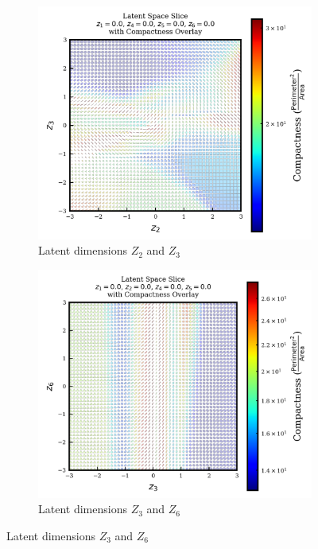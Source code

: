 \documentclass{article}
\begin{document}
\begin{figure}[H]
  \centering

  \begin{subfigure}{0.48\textwidth}
    \centering
    \includegraphics[width=\textwidth]{figures/VAEmodels/model5/varying_z2_z3_fixed_z1=0.0_z4=0.0_z5=0.0_z6=0.0.png}
    \caption{Latent dimensions $Z_2$ and $Z_3$}
    \label{fig:model5_z2_z3}
  \end{subfigure}
  \hfill
  \begin{subfigure}{0.48\textwidth}
    \centering
    \includegraphics[width=\textwidth]{figures/VAEmodels/model5/varying_z3_z6_fixed_z1=0.0_z2=0.0_z4=0.0_z5=0.0.png}
    \caption{Latent dimensions $Z_3$ and $Z_6$}
    \label{fig:model5_z3_z6}
  \end{subfigure}


\end{figure}
\end{document}
